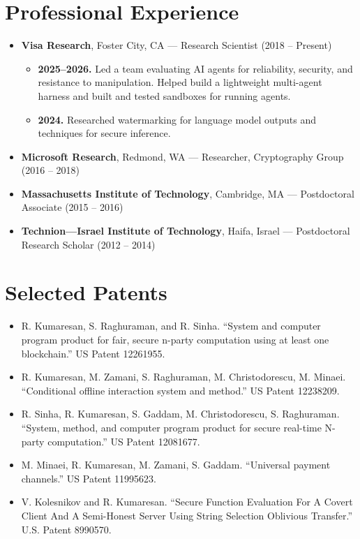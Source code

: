\documentclass[11pt]{article}
\begin{document}
\section{Professional Experience}
\begin{itemize}[leftmargin=*, noitemsep, topsep=0pt]
    \item \textbf{Visa Research}, Foster City, CA — Research Scientist (2018 – Present)
    \begin{itemize}[leftmargin=*, noitemsep, topsep=0pt]
        \item \textbf{2025--2026.} Led a team evaluating AI agents for reliability, security, and resistance to manipulation. Helped build a lightweight multi-agent harness and built and tested sandboxes for running agents.
        \item \textbf{2024.} Researched watermarking for language model outputs and techniques for secure inference.
    \end{itemize}
    \item \textbf{Microsoft Research}, Redmond, WA — Researcher, Cryptography Group (2016 – 2018)
    \item \textbf{Massachusetts Institute of Technology}, Cambridge, MA — Postdoctoral Associate (2015 – 2016)
    \item \textbf{Technion—Israel Institute of Technology}, Haifa, Israel — Postdoctoral Research Scholar (2012 – 2014)
\end{itemize}

\section{Selected Patents}
\begin{itemize}[leftmargin=*, noitemsep, topsep=0pt]
    \item R. Kumaresan, S. Raghuraman, and R. Sinha. ``System and computer program product for fair, secure n-party computation using at least one blockchain.'' US Patent 12261955.
    \item R. Kumaresan, M. Zamani, S. Raghuraman, M. Christodorescu, M. Minaei. ``Conditional offline interaction system and method.'' US Patent 12238209.
    \item R. Sinha, R. Kumaresan, S. Gaddam, M. Christodorescu, S. Raghuraman. ``System, method, and computer program product for secure real-time N-party computation.'' US Patent 12081677.
    \item M. Minaei, R. Kumaresan, M. Zamani, S. Gaddam. ``Universal payment channels.'' US Patent 11995623.
    \item V. Kolesnikov and R. Kumaresan. ``Secure Function Evaluation For A Covert Client And A Semi-Honest Server Using String Selection Oblivious Transfer.'' U.S. Patent 8990570.
\end{itemize}
\end{document}

